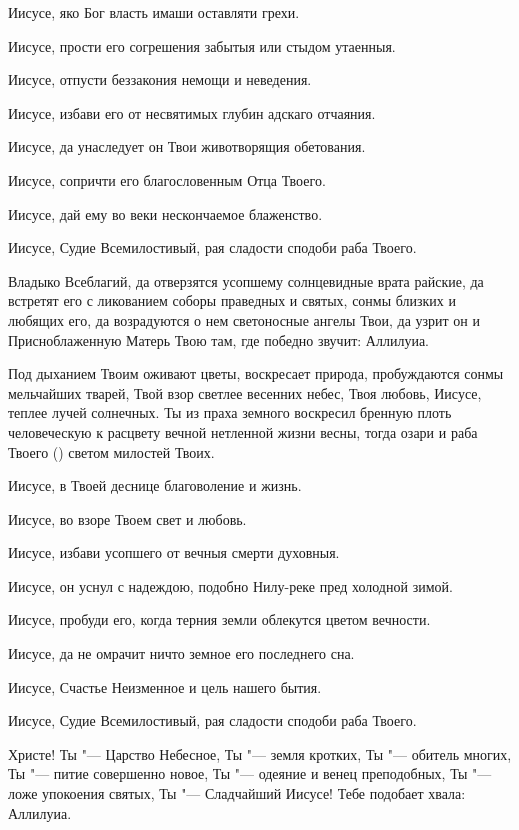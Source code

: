\begin{mymulticols}
Иисусе, яко Бог власть имаши оставляти грехи. 

Иисусе, прости его согрешения забытыя или стыдом утаенныя. 

Иисусе, отпусти беззакония немощи и неведения. 

Иисусе, избави его от несвятимых глубин адскаго отчаяния. 

Иисусе, да унаследует он Твои животворящия обетования. 

Иисусе, сопричти его благословенным Отца Твоего. 

Иисусе, дай ему во веки нескончаемое блаженство. 

Иисусе, Судие Всемилостивый, рая сладости сподоби раба Твоего.




Владыко Всеблагий, да отверзятся усопшему солнцевидные врата райские, да встретят его с ликованием соборы праведных и святых, сонмы близких и любящих его, да возрадуются о нем светоносные ангелы Твои, да узрит он и Присноблаженную Матерь Твою там, где победно звучит: Аллилуиа.




Под дыханием Твоим оживают цветы, воскресает природа, пробуждаются сонмы мельчайших тварей, Твой взор светлее весенних небес, Твоя любовь, Иисусе, теплее лучей солнечных. Ты из праха земного воскресил бренную плоть человеческую к расцвету вечной нетленной жизни весны, тогда озари и раба Твоего () светом милостей Твоих. 

Иисусе, в Твоей деснице благоволение и жизнь. 

Иисусе, во взоре Твоем свет и любовь. 

Иисусе, избави усопшего от вечныя смерти духовныя. 

Иисусе, он уснул с надеждою, подобно Нилу-реке пред холодной зимой. 

Иисусе, пробуди его, когда терния земли облекутся цветом вечности. 

Иисусе, да не омрачит ничто земное его последнего сна. 

Иисусе, Счастье Неизменное и цель нашего бытия. 

Иисусе, Судие Всемилостивый, рая сладости сподоби раба Твоего.




Христе! Ты "--- Царство Небесное, Ты "--- земля кротких, Ты "--- обитель многих, Ты "--- питие совершенно новое, Ты "--- одеяние и венец преподобных, Ты "--- ложе упокоения святых, Ты "--- Сладчайший Иисусе! Тебе подобает хвала: Аллилуиа.



\end{mymulticols}
